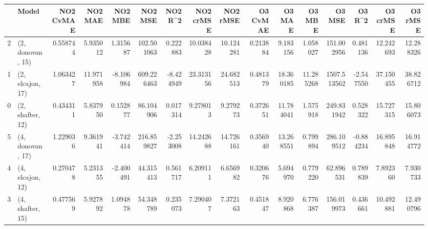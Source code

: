 \begin{tabular}{llrrrrrrrrrrrrrr}
\toprule
{} &             Model &  NO2 CvMAE &    NO2 MAE &   NO2 MBE &     NO2 MSE &   NO2 R\textasciicircum2 &  NO2 crMSE &   NO2 rMSE &  O3 CvMAE &     O3 MAE &     O3 MBE &       O3 MSE &    O3 R\textasciicircum2 &   O3 crMSE &    O3 rMSE \\
\midrule
2 &  (2, donovan, 15) &   0.558744 &   5.935012 &  1.315687 &  102.501063 &  0.222883 &  10.038428 &  10.124281 &  0.213884 &   9.183156 &   1.058027 &   151.002956 &  0.481136 &  12.242693 &  12.288326 \\
1 &  (2, elcajon, 17) &   1.063427 &  11.971958 & -8.106984 &  609.226463 & -8.424949 &  23.313156 &  24.682513 &  0.481379 &  18.360185 &  11.285268 &  1507.513562 & -2.547550 &  37.150455 &  38.826712 \\
0 &  (2, shafter, 12) &   0.434311 &   5.837950 &  0.152877 &   86.104906 &  0.017314 &   9.278013 &   9.279273 &  0.372651 &  11.784041 &   1.575918 &   249.831942 &  0.528322 &  15.727315 &  15.806073 \\
5 &  (4, donovan, 17) &   1.229036 &   9.361941 & -3.742414 &  216.859827 & -2.253008 &  14.242688 &  14.726161 &  0.356940 &  13.268551 &   0.799894 &   286.109512 & -0.884234 &  16.895848 &  16.914772 \\
4 &  (4, elcajon, 12) &   0.270478 &   5.231355 & -2.400491 &   44.315413 &  0.561717 &   6.209111 &   6.656982 &  0.320676 &   5.694970 &   0.779220 &    62.896531 &  0.789839 &   7.892360 &   7.930733 \\
3 &  (4, shafter, 15) &   0.477569 &   5.927892 &  1.094878 &   54.348789 &  0.235073 &   7.290407 &   7.372163 &  0.451847 &   8.920868 &   6.776387 &   156.019973 &  0.436661 &  10.492881 &  12.490796 \\
\bottomrule
\end{tabular}
